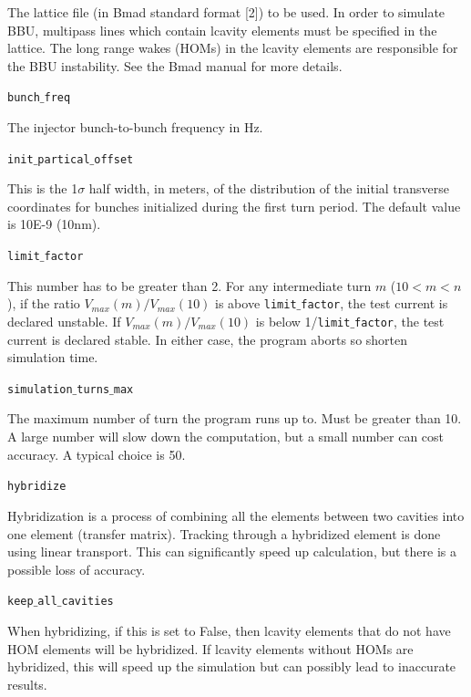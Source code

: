 \documentclass{article}
\begin{document}
\noindent
The lattice file (in Bmad standard format [2]) to be used. In order to simulate BBU, multipass lines which contain lcavity elements must be specified in the lattice. The long range wakes (HOMs) in the lcavity elements are responsible for the BBU instability. See the Bmad manual for more details.

\bigbreak
\hspace*{-2cm}
\texttt{bunch$\_$freq}

\noindent
The injector bunch-to-bunch frequency in Hz.

\bigbreak
\hspace*{-2cm}
\texttt{init$\_$partical$\_$offset}

\noindent
This is the 1$\sigma$ half width, in meters, of the distribution of the initial transverse coordinates
for bunches initialized during the first turn period. The default value is 10E-9 (10nm).

\bigbreak
\hspace*{-2cm}
\texttt{limit$\_$factor}

\noindent
This number has to be greater than 2.
For any intermediate turn $m$ ($10<m<n$), if the ratio $V_{max}(m)/V_{max}(10)$ is above \texttt{limit$\_$factor}, the test current is declared unstable. If $V_{max}(m)/V_{max}(10)$ is below 1/\texttt{limit$\_$factor}, the test current is declared stable. In either case, the program aborts so shorten simulation time.

\bigbreak
\hspace*{-2cm}
\texttt{simulation$\_$turns$\_$max}

\noindent
The maximum number of turn the program runs up to. Must be greater than 10. A large number will slow down the computation, but a small number can cost accuracy. A typical choice is 50.

\bigbreak
\hspace*{-2cm}
\texttt{hybridize}

\noindent
Hybridization is a process of combining all the elements between two cavities into one element (transfer matrix). Tracking through a hybridized element is done using linear transport. This can significantly speed up calculation, but there is a possible loss of accuracy. 

\bigbreak
\hspace*{-2cm}
\texttt{keep$\_$all$\_$cavities}

\noindent
When hybridizing, if this is set to False, then lcavity elements that do not have HOM elements will be hybridized. If lcavity elements without HOMs are
hybridized, this will speed up the simulation but can possibly lead to inaccurate results.
\end{document}
